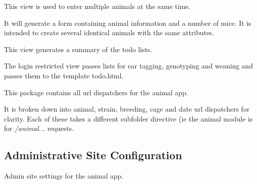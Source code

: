 \documentclass[letterpaper,10pt,english]{sphinxmanual}
\begin{document}

\begin{fulllineitems}
\label{api:mousedb.animal.views.multiple_pups}
This view is used to enter multiple animals at the same time.

It will generate a form containing animal information and a number of mice.  It is intended to create several identical animals with the same attributes.

\end{fulllineitems}


\begin{fulllineitems}
\label{api:mousedb.animal.views.todo}
This view generates a summary of the todo lists.

The login restricted view passes lists for ear tagging, genotyping and weaning and passes them to the template todo.html.

\end{fulllineitems}

\label{api:module-mousedb.animal.urls}
This package contains all url dispatchers for the animal app.

It is broken down into animal, strain, breeding, cage and date url dispatchers for clarity.
Each of these takes a different subfolder directive (ie the animal module is for \emph{/animal...} requests.


\subsection{Administrative Site Configuration}
\label{api:id8}\label{api:module-mousedb.animal.admin}
Admin site settings for the animal app.
\end{document}
